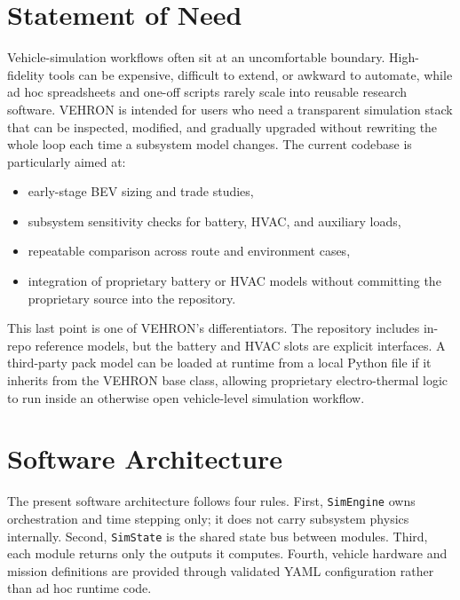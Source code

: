 \documentclass[11pt,a4paper]{article}
\begin{document}
\section{Statement of Need}
Vehicle-simulation workflows often sit at an uncomfortable boundary. High-fidelity tools can be expensive, difficult to extend, or awkward to automate, while ad hoc spreadsheets and one-off scripts rarely scale into reusable research software. VEHRON is intended for users who need a transparent simulation stack that can be inspected, modified, and gradually upgraded without rewriting the whole loop each time a subsystem model changes. The current codebase is particularly aimed at:

\begin{itemize}
\item early-stage BEV sizing and trade studies,
\item subsystem sensitivity checks for battery, HVAC, and auxiliary loads,
\item repeatable comparison across route and environment cases,
\item integration of proprietary battery or HVAC models without committing the proprietary source into the repository.
\end{itemize}

This last point is one of VEHRON's differentiators. The repository includes in-repo reference models, but the battery and HVAC slots are explicit interfaces. A third-party pack model can be loaded at runtime from a local Python file if it inherits from the VEHRON base class, allowing proprietary electro-thermal logic to run inside an otherwise open vehicle-level simulation workflow.

\section{Software Architecture}
The present software architecture follows four rules. First, \texttt{SimEngine} owns orchestration and time stepping only; it does not carry subsystem physics internally. Second, \texttt{SimState} is the shared state bus between modules. Third, each module returns only the outputs it computes. Fourth, vehicle hardware and mission definitions are provided through validated YAML configuration rather than ad hoc runtime code.
\end{document}
